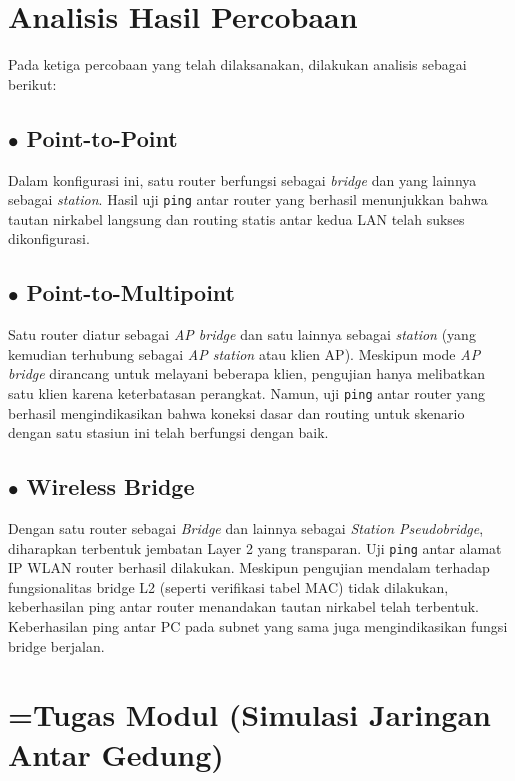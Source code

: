 \section{Analisis Hasil Percobaan}
Pada ketiga percobaan yang telah dilaksanakan, dilakukan analisis sebagai berikut:

\subsection*{$\bullet$ Point-to-Point}
Dalam konfigurasi ini, satu router berfungsi sebagai \textit{bridge} dan yang lainnya sebagai \textit{station}. Hasil uji \texttt{ping} antar router yang berhasil menunjukkan bahwa tautan nirkabel langsung dan routing statis antar kedua LAN telah sukses dikonfigurasi.

\subsection*{$\bullet$ Point-to-Multipoint}
Satu router diatur sebagai \textit{AP bridge} dan satu lainnya sebagai \textit{station} (yang kemudian terhubung sebagai \textit{AP station} atau klien AP). Meskipun mode \textit{AP bridge} dirancang untuk melayani beberapa klien, pengujian hanya melibatkan satu klien karena keterbatasan perangkat. Namun, uji \texttt{ping} antar router yang berhasil mengindikasikan bahwa koneksi dasar dan routing untuk skenario dengan satu stasiun ini telah berfungsi dengan baik.

\subsection*{$\bullet$ Wireless Bridge}
Dengan satu router sebagai \textit{Bridge} dan lainnya sebagai \textit{Station Pseudobridge}, diharapkan terbentuk jembatan Layer 2 yang transparan. Uji \texttt{ping} antar alamat IP WLAN router berhasil dilakukan. Meskipun pengujian mendalam terhadap fungsionalitas bridge L2 (seperti verifikasi tabel MAC) tidak dilakukan, keberhasilan ping antar router menandakan tautan nirkabel telah terbentuk. Keberhasilan ping antar PC pada subnet yang sama juga mengindikasikan fungsi bridge berjalan.

\section{=Tugas Modul (Simulasi Jaringan Antar Gedung)}
\label{sec:tugmod_simulasi}

